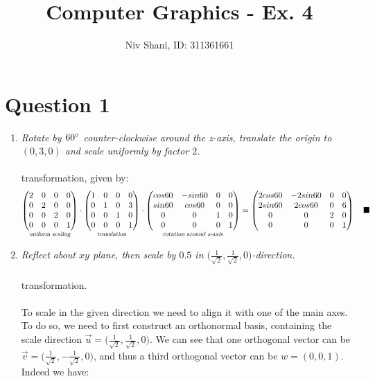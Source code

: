 \documentclass{article}
\title{\textbf{Computer Graphics - Ex. 4}}
\author{Niv Shani, ID: 311361661}
\date{}
\newcommand{\proofend}{\quad\blacksquare}
\newcommand{\question}[1]{\section*{Question #1}\vspace{.5cm}}
\begin{document}
    \maketitle
    \question{1}
    \begin{enumerate}
        \item \textsl{Rotate by $60\degree$ counter-clockwise around the z-axis, translate the origin to $(0,3,0)$ and scale uniformly by factor $2$.}\\\\
         transformation, given by:
        $$
            \underset{\textsl{uniform scaling}}{\begin{pmatrix}2&0&0&0\\0&2&0&0\\0&0&2&0\\0&0&0&1\end{pmatrix}}
            \cdot \underset{\textsl{translation}}{\begin{pmatrix}1&0&0&0\\0&1&0&3\\0&0&1&0\\0&0&0&1\end{pmatrix}}
            \cdot \underset{\textsl{rotation around z-axis}}{\begin{pmatrix}cos{60}&-sin60&0&0\\sin60&cos60&0&0\\0&0&1&0\\0&0&0&1\end{pmatrix}} = \begin{pmatrix}2cos60&-2sin60&0&0\\2sin60&2cos60&0&6\\0&0&2&0\\0&0&0&1\end{pmatrix}\proofend
        $$
        \item \textsl{Reflect about $xy$ plane, then scale by $0.5$ in $\big(\frac{1}{\sqrt{2}}, \frac{1}{\sqrt{2}}, 0\big)$-direction.}\\\\
         transformation.\\\\
        To scale in the given direction we need to align it with one of the main axes. To do so, we need to first construct an orthonormal basis, containing the scale direction $\vec{u} = \big(\frac{1}{\sqrt{2}}, \frac{1}{\sqrt{2}}, 0\big)$. We can see that one orthogonal vector can be $\vec{v} = \big(\frac{1}{\sqrt{2}}, -\frac{1}{\sqrt{2}}, 0\big)$, and thus a third orthogonal vector can be $w=(0,0,1)$. Indeed we have:

\end{enumerate}
\end{document}
